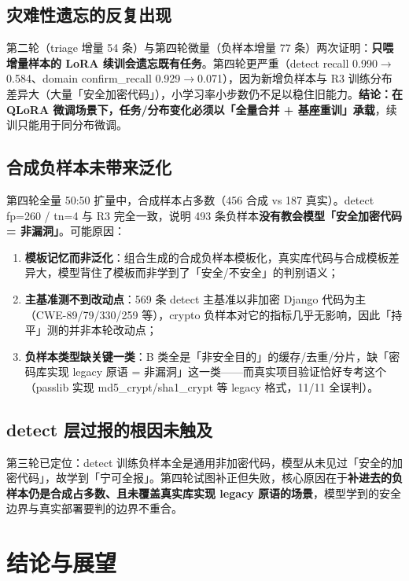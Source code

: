 \documentclass[UTF8,11pt]{ctexart}
\begin{document}
\subsection{灾难性遗忘的反复出现}

第二轮（triage 增量 54 条）与第四轮微量（负样本增量 77 条）两次证明：\textbf{只喂增量样本的 LoRA 续训会遗忘既有任务}。第四轮更严重（detect recall 0.990$\rightarrow$0.584、domain confirm\_recall 0.929$\rightarrow$0.071），因为新增负样本与 R3 训练分布差异大（大量「安全加密代码」），小学习率小步数仍不足以稳住旧能力。\textbf{结论：在 QLoRA 微调场景下，任务/分布变化必须以「全量合并 + 基座重训」承载}，续训只能用于同分布微调。

\subsection{合成负样本未带来泛化}

第四轮全量 50:50 扩量中，合成样本占多数（456 合成 vs 187 真实）。detect fp=260 / tn=4 与 R3 完全一致，说明 493 条负样本\textbf{没有教会模型「安全加密代码 = 非漏洞」}。可能原因：

\begin{enumerate}
  \item \textbf{模板记忆而非泛化}：组合生成的合成负样本模板化，真实库代码与合成模板差异大，模型背住了模板而非学到了「安全/不安全」的判别语义；
  \item \textbf{主基准测不到改动点}：569 条 detect 主基准以非加密 Django 代码为主（CWE-89/79/330/259 等），crypto 负样本对它的指标几乎无影响，因此「持平」测的并非本轮改动点；
  \item \textbf{负样本类型缺关键一类}：B 类全是「非安全目的」的缓存/去重/分片，缺「密码库实现 legacy 原语 = 非漏洞」这一类——而真实项目验证恰好专考这个（passlib 实现 md5\_crypt/sha1\_crypt 等 legacy 格式，11/11 全误判）。
\end{enumerate}

\subsection{detect 层过报的根因未触及}

第三轮已定位：detect 训练负样本全是通用非加密代码，模型从未见过「安全的加密代码」，故学到「宁可全报」。第四轮试图补正但失败，核心原因在于\textbf{补进去的负样本仍是合成占多数、且未覆盖真实库实现 legacy 原语的场景}，模型学到的安全边界与真实部署要判的边界不重合。

\section{结论与展望}
\end{document}
